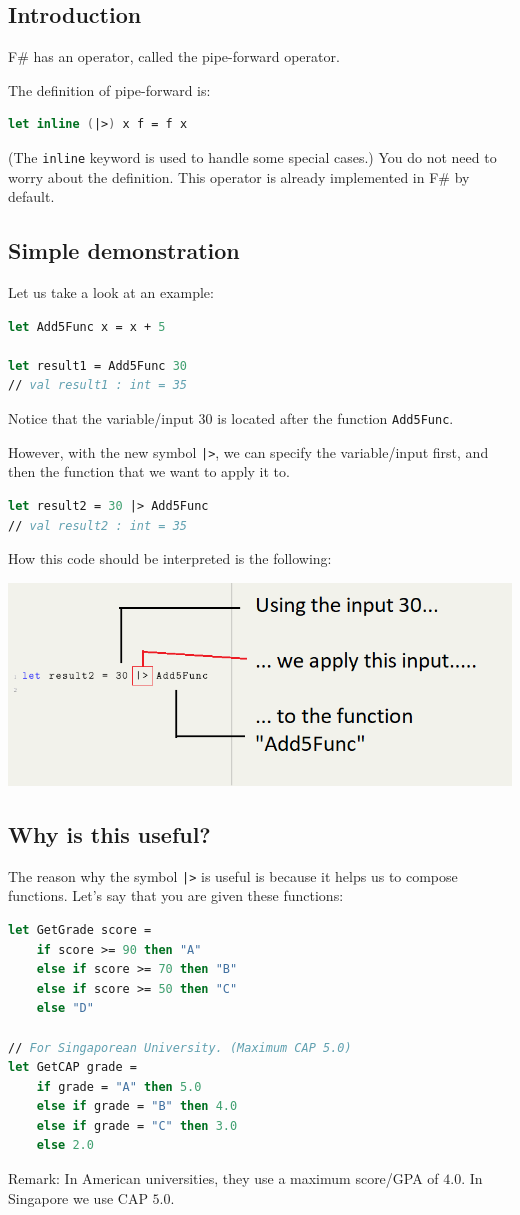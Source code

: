 \documentclass[12pt]{article}
\begin{document}
\subsection{Introduction}
F\# has an operator, called the pipe-forward operator. 

The definition of pipe-forward is:
\begin{lstlisting}[language=FSharp]
let inline (|>) x f = f x
\end{lstlisting}
(The \texttt{inline} keyword is used to handle some special cases.) You do not need to worry about the definition. This operator is already implemented in F\# by default.

\subsection{Simple demonstration}
Let us take a look at an example:
\begin{lstlisting}[language=FSharp]
let Add5Func x = x + 5

let result1 = Add5Func 30
// val result1 : int = 35
\end{lstlisting}
Notice that the variable/input $30$ is located after the function \texttt{Add5Func}. 

However, with the new symbol \texttt{|>}, we can specify the variable/input first, and then the function that we want to apply it to.
\begin{lstlisting}[language=FSharp]
let result2 = 30 |> Add5Func
// val result2 : int = 35
\end{lstlisting}
How this code should be interpreted is the following:
\begin{center}
\includegraphics[width=16cm]{pictures/picture21.png}
\end{center}
\subsection{Why is this useful?}
The reason why the symbol \texttt{|>} is useful is because it helps us to compose functions. Let's say that you are given these functions:
\begin{lstlisting}[language=FSharp]
let GetGrade score =
    if score >= 90 then "A"
    else if score >= 70 then "B"
    else if score >= 50 then "C"
    else "D"

// For Singaporean University. (Maximum CAP 5.0)
let GetCAP grade =
    if grade = "A" then 5.0
    else if grade = "B" then 4.0
    else if grade = "C" then 3.0
    else 2.0
\end{lstlisting}
Remark: In American universities, they use a maximum score/GPA of $4.0$. In Singapore we use CAP  $5.0$.
\end{document}
